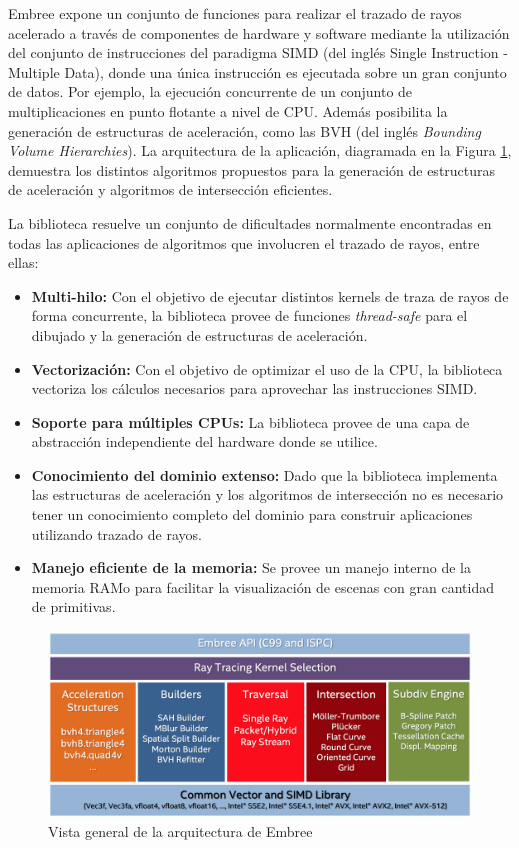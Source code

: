 Embree expone un conjunto de funciones para realizar el trazado de rayos acelerado a través de componentes de hardware y software mediante la utilización del conjunto de instrucciones del paradigma SIMD (del inglés Single Instruction - Multiple Data), donde una única instrucción es ejecutada sobre un gran conjunto de datos. Por ejemplo, la ejecución concurrente de un conjunto de multiplicaciones en punto flotante a nivel de CPU. Además posibilita la generación de estructuras de aceleración, como las BVH (del inglés \textit{Bounding Volume Hierarchies}). La arquitectura de la aplicación, diagramada en la Figura \ref{img:embree}, demuestra los distintos algoritmos propuestos para la generación de estructuras de aceleración y algoritmos de intersección eficientes.

La biblioteca resuelve un conjunto de dificultades normalmente encontradas en todas las aplicaciones de algoritmos que involucren el trazado de rayos, entre ellas:

\begin{itemize}
	\item \textbf{Multi-hilo:} Con el objetivo de ejecutar distintos kernels de traza de rayos de forma concurrente, la biblioteca provee de funciones \textit{thread-safe} para el dibujado y la generación de estructuras de aceleración.
	\item \textbf{Vectorización:} Con el objetivo de optimizar el uso de la CPU, la biblioteca vectoriza los cálculos necesarios para aprovechar las instrucciones SIMD.
	\item \textbf{Soporte para múltiples CPUs:} La biblioteca provee de una capa de abstracción independiente del hardware donde se utilice.
	\item \textbf{Conocimiento del dominio extenso:} Dado que la biblioteca implementa las estructuras de aceleración y los algoritmos de intersección no es necesario tener un conocimiento completo del dominio para construir aplicaciones utilizando trazado de rayos.
	\item \textbf{Manejo eficiente de la memoria:} Se provee un manejo interno de la memoria RAMo para facilitar la visualización de escenas con gran cantidad de primitivas.
\end{itemize}

\vspace{5mm}
\begin{figure}[H]
	\centering
	\includegraphics[width=.8\linewidth]{assets/embree}
	\caption{Vista general de la arquitectura de Embree}
	\label{img:embree}
\end{figure}

